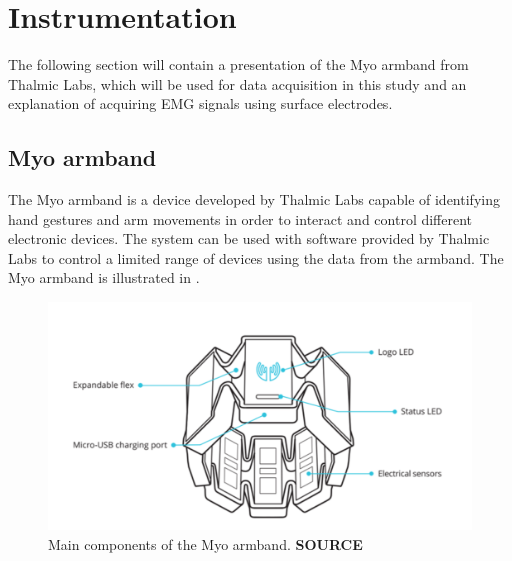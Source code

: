 \section{Instrumentation} \label{sec:myoband}

The following section will contain a presentation of the Myo armband from Thalmic Labs, which will be used for data acquisition in this study and an explanation of acquiring EMG signals using surface electrodes.

\subsection{Myo armband}

The Myo armband is a device developed by Thalmic Labs capable of identifying hand gestures and arm movements in order to interact and control different electronic devices. The system can be used with software provided by Thalmic Labs to control a limited range of devices using the data from the armband.
The Myo armband is illustrated in . 

\begin{figure}[H]                    
	\includegraphics[width=.5\textwidth]{figures/myob/armband}  %
	\caption{Main components of the Myo armband. \textbf{SOURCE}}
	\label{fig:armband}  %
\end{figure}



